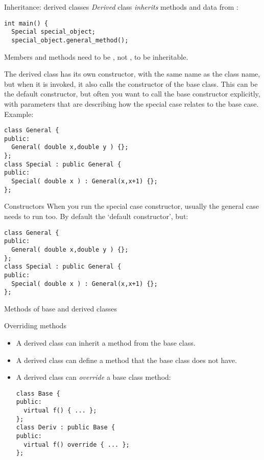 \begin{slide}{Inheritance: derived classes}
  \label{sl:obj-derive}
  \emph{Derived} class 
  \emph{inherits} methods and data from
   :
\begin{verbatim}
int main() {
  Special special_object;
  special_object.general_method();
\end{verbatim}
Members and methods need to be , not , to be inheritable.
\end{slide}

The derived class has its own constructor, with the same name as the
class name, but when it is invoked, it also calls the constructor of
the base class. This can be the default constructor, but often you
want to call the base constructor explicitly, with parameters that are
describing how the special case relates to the base case. Example:
\begin{verbatim}
class General {
public:
  General( double x,double y ) {};
};
class Special : public General {
public:
  Special( double x ) : General(x,x+1) {};
};
\end{verbatim}

\begin{slide}{Constructors}
  \label{sl:obj-derive-construct}
  When you run the special case constructor, usually the general case
  needs to run too. By default the `default constructor', but:
\begin{verbatim}
class General {
public:
  General( double x,double y ) {};
};
class Special : public General {
public:
  Special( double x ) : General(x,x+1) {};
};
\end{verbatim}
\end{slide}

 {Methods of base and derived classes}
\label{sec:derive-method}

\begin{block}{Overriding methods}
  \label{sl:obj-method-override}
  \begin{itemize}
  \item A derived class can inherit a method from the base class.
  \item A derived class can define a method that the base class does
    not have.
  \item A derived class can \emph{override} a
    base class method:
\begin{verbatim}
class Base {
public:
  virtual f() { ... };
};
class Deriv : public Base {
public:
  virtual f() override { ... };
};
\end{verbatim}
  \end{itemize}
\end{block}

